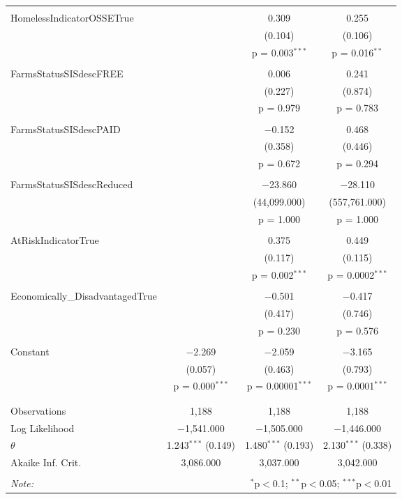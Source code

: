\begin{table}[!htbp]
\begin{tabular}{@{\extracolsep{5pt}}lccc}
  & & & \\ 
 HomelessIndicatorOSSETrue &  & 0.309 & 0.255 \\ 
  &  & (0.104) & (0.106) \\ 
  &  & p = 0.003$^{***}$ & p = 0.016$^{**}$ \\ 
  & & & \\ 
 FarmsStatusSISdescFREE &  & 0.006 & 0.241 \\ 
  &  & (0.227) & (0.874) \\ 
  &  & p = 0.979 & p = 0.783 \\ 
  & & & \\ 
 FarmsStatusSISdescPAID &  & $-$0.152 & 0.468 \\ 
  &  & (0.358) & (0.446) \\ 
  &  & p = 0.672 & p = 0.294 \\ 
  & & & \\ 
 FarmsStatusSISdescReduced &  & $-$23.860 & $-$28.110 \\ 
  &  & (44,099.000) & (557,761.000) \\ 
  &  & p = 1.000 & p = 1.000 \\ 
  & & & \\ 
 AtRiskIndicatorTrue &  & 0.375 & 0.449 \\ 
  &  & (0.117) & (0.115) \\ 
  &  & p = 0.002$^{***}$ & p = 0.0002$^{***}$ \\ 
  & & & \\ 
 Economically\_DisadvantagedTrue &  & $-$0.501 & $-$0.417 \\ 
  &  & (0.417) & (0.746) \\ 
  &  & p = 0.230 & p = 0.576 \\ 
  & & & \\ 
 Constant & $-$2.269 & $-$2.059 & $-$3.165 \\ 
  & (0.057) & (0.463) & (0.793) \\ 
  & p = 0.000$^{***}$ & p = 0.00001$^{***}$ & p = 0.0001$^{***}$ \\ 
  & & & \\ 
\hline \\[-1.8ex] 
Observations & 1,188 & 1,188 & 1,188 \\ 
Log Likelihood & $-$1,541.000 & $-$1,505.000 & $-$1,446.000 \\ 
$\theta$ & 1.243$^{***}$  (0.149) & 1.480$^{***}$  (0.193) & 2.130$^{***}$  (0.338) \\ 
Akaike Inf. Crit. & 3,086.000 & 3,037.000 & 3,042.000 \\ 
\hline 
\hline \\[-1.8ex] 
\textit{Note:}  & \multicolumn{3}{r}{$^{*}$p$<$0.1; $^{**}$p$<$0.05; $^{***}$p$<$0.01} \\ 
\end{tabular} 
\end{table} 
